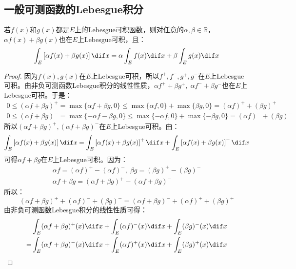 \subsection{一般可测函数的Lebesgue积分}

\begin{theorem}[Lebesgue积分的线性性]
	若$f(x)$和$g(x)$都是$E$上的Lebesgue可积函数，则对任意的$\alpha,\beta\in\mathbb{R}$，$\alpha f(x)+\beta g(x)$也在$E$上Lebesgue可积，且：
	\begin{equation*}
		\int_{E}\left[\alpha f(x)+\beta g(x)\right]\dif x=\alpha\int_{E}f(x)\dif x+\beta\int_{E}g(x)\dif x
	\end{equation*}
\end{theorem}
\begin{proof}
	因为$f(x),g(x)$在$E$上Lebesgue可积，所以$f^+,f^-,g^+,g^-$在$E$上Lebesgue可积。由非负可测函数Lebesgue积分的线性性质，$\alpha f^++\beta g^+,\;\alpha f^-+\beta g^-$也在$E$上Lebesgue可积。于是：
	\begin{gather*}
		0\leqslant(\alpha f+\beta g)^+=\max\{\alpha f+\beta g,0\}\leqslant\max\{\alpha f,0\}+\max\{\beta g,0\}=(\alpha f)^++(\beta g)^+ \\
		0\leqslant(\alpha f+\beta g)^-=\max\{-\alpha f-\beta g,0\}\leqslant\max\{-\alpha f,0\}+\max\{-\beta g,0\}=(\alpha f)^-+(\beta g)^-
	\end{gather*}
	所以$(\alpha f+\beta g)^+,(\alpha f+\beta g)^-$在$E$上Lebesgue可积。由：
	\begin{equation*}
		\int_{E}\left[\alpha f(x)+\beta g(x)\right]\dif x=\int_{E}\left[\alpha f(x)+\beta g(x)\right]^+\dif x+\int_{E}\left[\alpha f(x)+\beta g(x)\right]^-\dif x
	\end{equation*}
	可得$\alpha f+\beta g$在$E$上Lebesgue可积。因为：
	\begin{gather*}
		\alpha f=(\alpha f)^+-(\alpha f)^-,\;\beta g=(\beta g)^+-(\beta g)^- \\
		\alpha f+\beta g=(\alpha f+\beta g)^+-(\alpha f+\beta g)^-
	\end{gather*}
	所以：
	\begin{equation*}
		(\alpha f+\beta g)^++(\alpha f)^-+(\beta g)^-=(\alpha f+\beta g)^-+(\alpha f)^++(\beta g)^+
	\end{equation*}
	由非负可测函数Lebesgue积分的线性性质可得：
	\begin{align*}
		&\int_{E}(\alpha f+\beta g)^+(x)\dif x+\int_{E}(\alpha f)^-(x)\dif x+\int_{E}(\beta g)^-(x)\dif x \\
		=&\int_{E}(\alpha f+\beta g)^-(x)\dif x+\int_{E}(\alpha f)^+(x)\dif x+\int_{E}(\beta g)^+(x)\dif x

\end{align*}
\end{proof}
